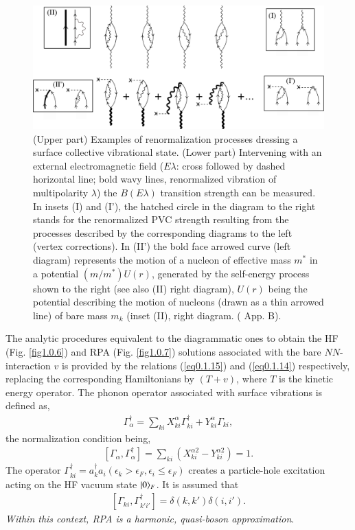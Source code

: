 \begin{figure}
	\centerline {
		\includegraphics*[width=15cm]{introduccion/figs/figpreface9}
	}
	\caption{(Upper part) Examples of renormalization processes dressing a surface collective vibrational state. (Lower part) Intervening with an external electromagnetic field ($E\lambda$: cross followed by dashed horizontal line; bold wavy lines, renormalized vibration of multipolarity $\lambda$) the $B(E\lambda)$ transition strength can be measured. In insets (I) and (I'), the hatched circle in the diagram to the right stands for the renormalized PVC strength resulting from the processes described by the corresponding diagrams to the left (vertex corrections). In  (II') the bold face arrowed curve  (left diagram) represents  the motion of a nucleon of effective mass $m^*$ in a potential $(m/m^*)U(r)$, generated by the self-energy process shown to the right (see also (II) right diagram), $U(r)$  being the potential describing the motion of nucleons (drawn as a thin  arrowed line) of bare mass $m_k$  (inset (II), right diagram. (\cite{Brink:05} App. B).}
	\label{fig1.0.9}
\end{figure}

The analytic procedures equivalent  to the diagrammatic ones to obtain the HF (Fig. \ref{fig1.0.6}) and RPA (Fig. \ref{fig1.0.7}) solutions associated with the bare $NN$-interaction $v$ is provided by the relations (\ref{eq0.1.15}) and (\ref{eq0.1.14}) respectively, replacing the corresponding Hamiltonians by $(T+v)$, where $T$ is the kinetic energy operator. The phonon operator associated with surface vibrations is defined as,
\begin{align}\label{eq1.0.26}
\Gamma_\alpha^\dagger=\sum_{ki}X_{ki}^\alpha\Gamma_{ki}^\dagger+Y_{ki}^\alpha\Gamma_{ki},
\end{align}
 the normalization condition being, 
\begin{align}\label{eq1.0.27}
\left[\Gamma_\alpha,\Gamma_\alpha^\dagger\right]=\sum_{ki}\left(X_{ki}^{\alpha2}-Y_{ki}^{\alpha2}\right)=1.
\end{align}
The operator $\Gamma^\dagger_{ki}=a^\dagger_{k}a_{i} (\epsilon_k>\epsilon_F,\epsilon_i\leq\epsilon_F)$ creates a particle-hole excitation acting on the HF vacuum state $|{0} \rangle_F$. It is assumed that
\begin{align}\label{eq1.0.28}
\left[\Gamma_{ki},\Gamma_{k'i'}^\dagger\right]=\delta(k,k')\delta(i,i').
\end{align}
\textit{Within this context, RPA is a harmonic, quasi-boson approximation}.


